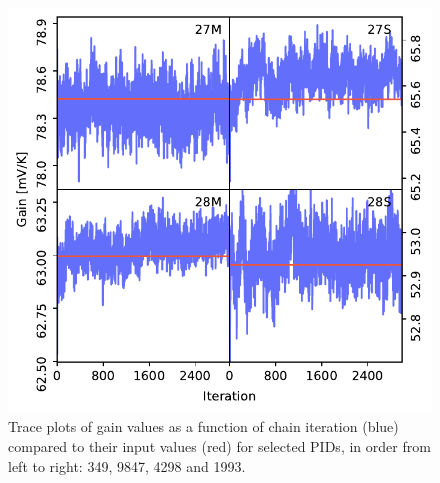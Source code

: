 \documentclass[twocolumn]{aa}%
\begin{document}
\begin{figure}[t]
    \begin{center}
        \includegraphics[width=\linewidth]{figs/simtrace_gain.pdf}
        \caption{Trace plots of gain values as a function of chain iteration (blue) compared to their input values (red) for selected PIDs, in order from left to right: 349, 9847, 4298 and 1993.}
        \label{fig:trace_gain}
    \end{center}

\end{figure}
\end{document}
